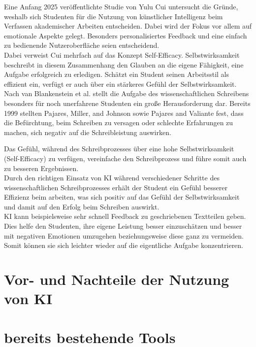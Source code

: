 \documentclass[../main.tex]{subfiles}
\begin{document}
Eine Anfang 2025 veröffentlichte Studie von Yulu Cui untersucht die Gründe, weshalb sich Studenten für die Nutzung von 
künstlicher Intelligenz beim Verfassen akademischer Arbeiten entscheiden. Dabei wird der Fokus vor allem auf emotionale 
Aspekte gelegt. Besonders personalisiertes Feedback und eine einfach zu bedienende Nutzeroberfläche seien entscheidend.\cite{SelfEfficacyBeliefs} \\
Dabei verweist Cui mehrfach auf das Konzept Self-Efficacy. Selbstwirksamkeit beschreibt in diesem Zusammenhang den Glauben 
an die eigene Fähigkeit, eine Aufgabe erfolgreich zu erledigen. Schätzt ein Student seinen Arbeitsstil als effizient ein, 
verfügt er auch über ein stärkeres Gefühl der Selbstwirksamkeit.\\
Nach van Blankenstein et al. stellt die Aufgabe des wissenschaftlichen Schreibens besonders für noch unerfahrene Studenten 
ein große Herausforderung dar. Bereits 1999 stellten Pajares, Miller, and Johnson sowie Pajares and Valiante fest,
dass die Befürchtung, beim Schreiben zu versagen oder schlechte Erfahrungen zu machen, sich negativ auf die Schreibleistung 
auswirken.\cite{writingSelfBeliefs,writingSelfBeliefsMiddleSchool}

Das Gefühl, während des Schreibprozesses über eine hohe Selbstwirksamkeit (Self-Efficacy) zu verfügen, vereinfache den 
Schreibprozess und führe somit auch zu besseren Ergebnissen.\cite{SelfEfficacyBeliefs} \\
Durch den richtigen Einsatz von KI während verschiedener Schritte des wissenschaftlichen Schreibprozesses erhält der Student
ein Gefühl besserer Effizienz beim arbeiten, was sich positiv auf das Gefühl der Selbstwirksamkeit und damit auf den Erfolg
beim Schreiben auswirkt.\\
KI kann beispielsweise sehr schnell Feedback zu geschriebenen Textteilen geben. Dies helfe den Studenten, ihre eigene 
Leistung besser einzuschätzen und besser mit negativen Emotionen umzugehen beziehungsweise diese ganz zu vermeiden. Somit 
können sie sich leichter wieder auf die eigentliche Aufgabe konzentrieren.\cite{SelfEfficacyBeliefs} 



\section{Vor- und Nachteile der Nutzung von KI}
\section{bereits bestehende Tools}
\end{document}
